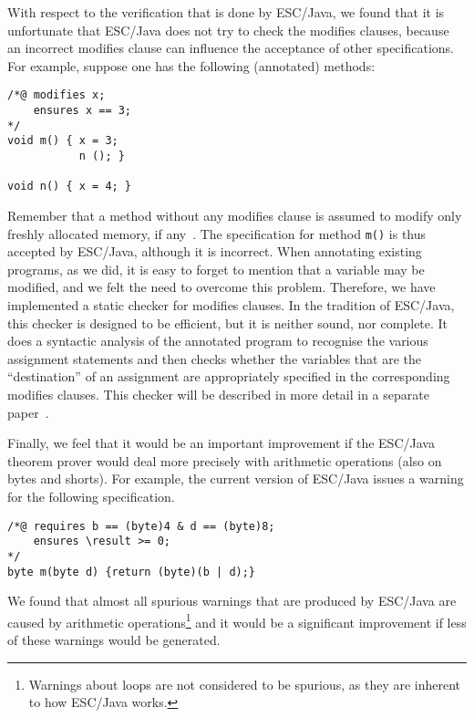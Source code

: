 \documentclass[a4paper]{llncs}
\begin{document}
With respect to the verification that is done by ESC/Java, we found
that it is unfortunate that ESC/Java does not try to check the modifies
clauses, because an incorrect modifies clause can influence the
acceptance of other specifications. For example, suppose one has the
following (annotated) methods$:$
\begin{verbatim}
/*@ modifies x;
    ensures x == 3;
*/
void m() { x = 3;
           n (); }

void n() { x = 4; }
\end{verbatim}
Remember that a method without any modifies clause is assumed to
modify only freshly allocated memory, if any~\cite{LeinoNS00}. The
specification for method \texttt{m()} is thus accepted by ESC/Java,
although it is incorrect. When annotating existing programs, as we
did, it is easy to forget to mention that a variable may be modified,
and we felt the need to overcome this problem.  Therefore, we have
implemented a static checker for modifies clauses. In the tradition of
ESC/Java, this checker is designed to be efficient, but it is neither
sound, nor complete. It does a syntactic analysis of the annotated
program to recognise the various assignment statements and then checks
whether the variables that are the ``destination'' of an assignment
are appropriately specified in the corresponding modifies
clauses. This checker will be described in more detail in a separate
paper~\cite{CatanoH02b}.

Finally, we feel that it would be an important improvement if the
ESC/Java theorem prover would deal more precisely with arithmetic
operations (also on bytes and shorts). For example, the current
version of ESC/Java issues a warning for the following specification.
\begin{verbatim}
/*@ requires b == (byte)4 & d == (byte)8;
    ensures \result >= 0;
*/
byte m(byte d) {return (byte)(b | d);}
\end{verbatim}
We found that almost all spurious warnings that are produced by
ESC/Java are caused by arithmetic operations\footnote{Warnings about
loops are not considered to be spurious, as they are inherent to how
ESC/Java works.} and it would be a significant improvement if less of
these warnings would be generated.

\end{document}
